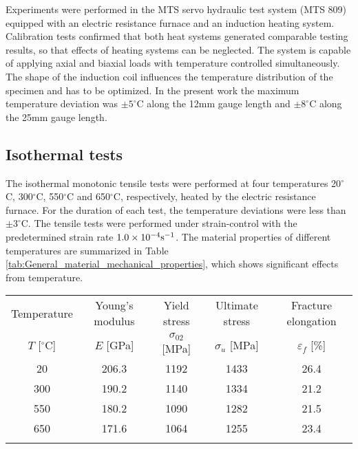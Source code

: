 \documentclass[preprint,5p,twocolumn,11pt,sort&compress]{elsarticle}
\begin{document}
Experiments were performed in the MTS servo hydraulic test system (MTS 809) equipped with  an electric resistance furnace and an induction heating system. Calibration tests confirmed that both heat systems generated comparable testing results, so that effects of heating systems can be neglected. The system is capable of applying axial and biaxial loads with temperature controlled simultaneously.
The shape of the induction coil influences the temperature distribution of the specimen and has to be optimized. In the present work the maximum temperature deviation was $\pm5^{\circ}$C along the 12mm gauge length  and $\pm8^{\circ}$C along the 25mm gauge length.



\subsection{Isothermal tests}
\noindent
The isothermal monotonic tensile tests were performed at four temperatures 20$^{\circ}$C, 300$^{\circ}$C, 550$^{\circ}$C and 650$^{\circ}$C, respectively, heated by the electric resistance furnace. For the duration of each test, the temperature deviations  were less than $\pm3^{\circ}$C. The tensile tests were performed under strain-control with the predetermined strain rate $1.0\times 10^{-4}\rm{s}^{-1}$.
The material properties of different temperatures are summarized in Table \ref{tab:General_material_mechanical_properties}, which shows significant effects from temperature.

\begin{table*}[htbp]
  \centering
  \caption{Results of isothermal tensile tests.}
    \begin{tabular}{ccccc}
    \hline
    Temperature         & Young's modulus   & Yield stress            & Ultimate stress     & Fracture elongation\\
    $T$ [$^{\circ}$C]   & $E$ [GPa]         & $\sigma_{02}$ [MPa]  & $\sigma_u$ [MPa]    & $\varepsilon_f$ [\%]\\
    \hline
    20    & 206.3 & 1192 & 1433 & 26.4 \\
    300   & 190.2 & 1140 & 1334 & 21.2 \\
    550   & 180.2 & 1090 & 1282 & 21.5 \\
    650   & 171.6 & 1064 & 1255 & 23.4 \\
    \hline \\
    \end{tabular}%
  \label{tab:General_material_mechanical_properties}%
\end{table*}%
\end{document}
